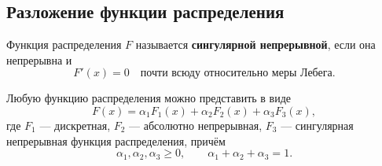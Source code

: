 \clearpage
\begingroup
{}
\everymath{\textstyle}
\subsection{Разложение функции распределения}

\begin{definition}
    Функция распределения $F$ называется \textbf{сингулярной непрерывной},
    если она непрерывна и
    \[
        F'(x)=0
        \quad\text{почти всюду относительно меры Лебега}.
    \]
\end{definition}

\begin{theorem}
    Любую функцию распределения можно представить в виде
    \[
        F(x)=\alpha_1F_1(x)+\alpha_2F_2(x)+\alpha_3F_3(x),
    \]
    где $F_1$ --- дискретная, $F_2$ --- абсолютно непрерывная,
    $F_3$ --- сингулярная непрерывная функция распределения, причём
    \[
        \alpha_1,\alpha_2,\alpha_3\geq0,
        \qquad \alpha_1+\alpha_2+\alpha_3=1.
    \]
\end{theorem}
\endgroup
